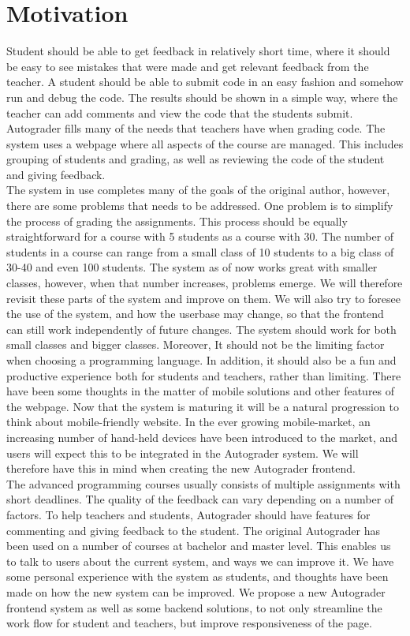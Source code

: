 \chapter*{Motivation}
Student should be able to get feedback in relatively short time, where it should be easy to see mistakes that were made and get relevant feedback from the teacher. A student should be able to submit code in an easy fashion and somehow run and debug the code. The results should be shown in a simple way, where the teacher can add comments and view the code that the students submit. Autograder fills many of the needs that teachers have when grading code. The system uses a webpage where all aspects of the course are managed. This includes grouping of students and grading, as well as reviewing the code of the student and giving feedback.
\\The system in use completes many of the goals of the original author, however, there are some problems that needs to be addressed. One problem is to simplify the process of grading the assignments. This process should be equally straightforward for a course with 5 students as a course with 30. The number of students in a course can range from a small class of 10 students to a big class of 30-40 and even 100 students. The system as of now works great with smaller classes, however, when that number increases, problems emerge. We will therefore revisit these parts of the system and improve on them. We will also try to foresee the use of the system, and how the userbase may change, so that the frontend can still work independently of future changes. The system should work for both small classes and bigger classes. Moreover, It should not be the limiting factor when choosing a programming language. In addition, it should also be a fun and productive experience both for students and teachers, rather than limiting. There have been some thoughts in the matter of mobile solutions and other features of the webpage. Now that the system is maturing it will be a natural progression to think about mobile-friendly website. In the ever growing mobile-market, an increasing number of hand-held devices have been introduced to the market, and users will expect this to be integrated in the Autograder system. We will therefore have this in mind when creating the new Autograder frontend.
\\The advanced programming courses usually consists of multiple assignments with short deadlines. The quality of the feedback can vary depending on a number of factors. To help teachers and students, Autograder should have features for commenting and giving feedback to the student. The original Autograder has been used on a number of courses at bachelor and master level. This enables us to talk to users about the current system, and ways we can improve it. We have some personal experience with the system as students, and thoughts have been made on how the new system can be improved. We propose a new Autograder frontend system as well as some backend solutions, to not only streamline the work flow for student and teachers, but improve responsiveness of the page.